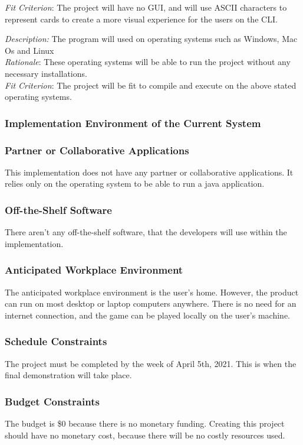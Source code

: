 \documentclass[12pt, titlepage]{article}
\begin{document}
\textit{Fit Criterion}: The project will have no GUI, and will use ASCII characters to represent cards to create a more visual experience for the users on the CLI.

\noindent \textit{Description:} The program will used  on operating systems such as Windows, Mac Os and Linux \\
\textit{Rationale}: These operating systems will be able to run the project without any necessary installations.\\
\textit{Fit Criterion}: The project will be fit  to compile and execute on the above stated operating systems.\\

\subsubsection{Implementation Environment of the Current System}


\subsubsection{Partner or Collaborative Applications}
This implementation does not have any partner or collaborative applications. It relies only on the operating system to be able to run a java application.

\subsubsection{Off-the-Shelf Software}
There aren't any off-the-shelf software, that the developers will use within the implementation. 

\subsubsection{Anticipated Workplace Environment}
The anticipated workplace environment is the user's home. However, the product can run on most desktop or laptop computers anywhere. There is no need for an internet connection, and the game can be played locally on the user's machine.

\subsubsection{Schedule Constraints}
The project must be completed by the week of April 5th, 2021. This is when the final demonstration will take place.

\subsubsection{Budget Constraints}
The budget is \$0 because there is no monetary funding. Creating this project should have no monetary cost, because there will be no costly resources used.
\end{document}
